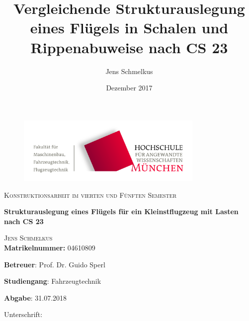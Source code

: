 \begin{titlepage}
\setcounter{page}{1}
\begin{center}
\begin{figure}[h!]
\vspace{0cm}
\centering
\includegraphics[width=0.8\textwidth]{bilder/Logos/FK03_CMYK_Block.png}
\\[0.8cm]
\end{figure}
\vspace{1.5cm}

{\fontsize{20}{60}\scshape Konstruktionsarbeit im vierten und Fünften Semester} 
\\[1.1cm]

\begin{doublespace}
{\fontsize{30}{22}\selectfont \textbf{Strukturauslegung eines Flügels für ein Kleinstflugzeug mit Lasten nach CS 23}\par} 
\vspace{1.4cm}
\end{doublespace}

\title{Vergleichende Strukturauslegung eines Flügels in Schalen und Rippenabuweise nach CS 23}
\author{Jens Schmelkus}
\date{Dezember 2017}

{\fontsize{23}{60}\scshape Jens Schmelkus}
\\[2.0cm]

\textbf{Matrikelnummer:} 04610809

\textbf{Betreuer}: Prof. Dr. Guido Sperl


\textbf{Studiengang}: Fahrzeugtechnik 

\textbf{Abgabe}: 31.07.2018

\vspace{2cm}

Unterschrift: \underline{\hspace{4cm}} 

\vfill


\end{center}
\end{titlepage}
